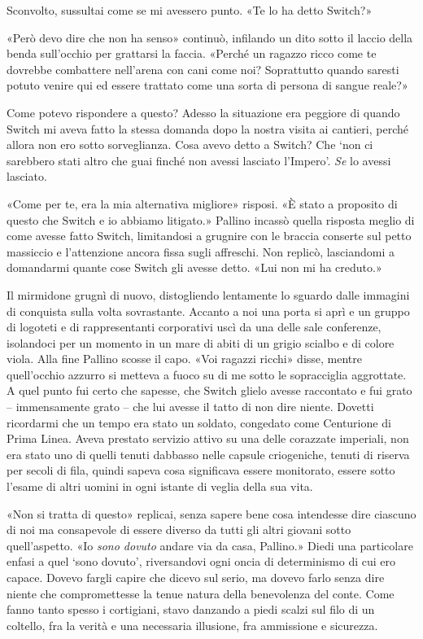 Sconvolto, sussultai come se mi avessero punto. «Te lo ha detto Switch?»

«Però devo dire che non ha senso» continuò, infilando un dito sotto il
laccio della benda sull'occhio per grattarsi la faccia. «Perché un
ragazzo ricco come te dovrebbe combattere nell'arena con cani come noi?
Soprattutto quando saresti potuto venire qui ed essere trattato come una
sorta di persona di sangue reale?»

Come potevo rispondere a questo? Adesso la situazione era peggiore di
quando Switch mi aveva fatto la stessa domanda dopo la nostra visita ai
cantieri, perché allora non ero sotto sorveglianza. Cosa avevo detto a
Switch? Che `non ci sarebbero stati altro che guai finché non avessi
lasciato l'Impero'. \emph{Se} lo avessi lasciato.

«Come per te, era la mia alternativa migliore» risposi. «È stato a
proposito di questo che Switch e io abbiamo litigato.» Pallino incassò
quella risposta meglio di come avesse fatto Switch, limitandosi a
grugnire con le braccia conserte sul petto massiccio e l'attenzione
ancora fissa sugli affreschi. Non replicò, lasciandomi a domandarmi
quante cose Switch gli avesse detto. «Lui non mi ha creduto.»

Il mirmidone grugnì di nuovo, distogliendo lentamente lo sguardo dalle
immagini di conquista sulla volta sovrastante. Accanto a noi una porta
si aprì e un gruppo di logoteti e di rappresentanti corporativi uscì da
una delle sale conferenze, isolandoci per un momento in un mare di abiti
di un grigio scialbo e di colore viola. Alla fine Pallino scosse il
capo. «Voi ragazzi ricchi» disse, mentre quell'occhio azzurro si metteva
a fuoco su di me sotto le sopracciglia aggrottate. A quel punto fui
certo che sapesse, che Switch glielo avesse raccontato e fui grato --
immensamente grato -- che lui avesse il tatto di non dire niente.
Dovetti ricordarmi che un tempo era stato un soldato, congedato come
Centurione di Prima Linea. Aveva prestato servizio attivo su una delle
corazzate imperiali, non era stato uno di quelli tenuti dabbasso nelle
capsule criogeniche, tenuti di riserva per secoli di fila, quindi sapeva
cosa significava essere monitorato, essere sotto l'esame di altri uomini
in ogni istante di veglia della sua vita.

«Non si tratta di questo» replicai, senza sapere bene cosa intendesse
dire ciascuno di noi ma consapevole di essere diverso da tutti gli altri
giovani sotto quell'aspetto. «Io \emph{sono dovuto} andare via da casa,
Pallino.» Diedi una particolare enfasi a quel `sono dovuto',
riversandovi ogni oncia di determinismo di cui ero capace. Dovevo fargli
capire che dicevo sul serio, ma dovevo farlo senza dire niente che
compromettesse la tenue natura della benevolenza del conte. Come fanno
tanto spesso i cortigiani, stavo danzando a piedi scalzi sul filo di un
coltello, fra la verità e una necessaria illusione, fra ammissione e
sicurezza.

